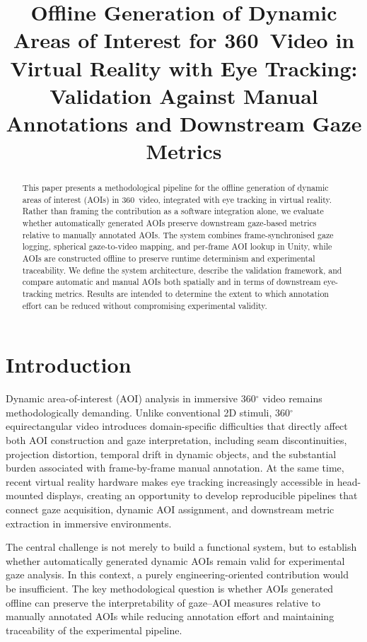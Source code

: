 \documentclass[11pt]{article}
\title{Offline Generation of Dynamic Areas of Interest for 360\textdegree\ Video in Virtual Reality with Eye Tracking: Validation Against Manual Annotations and Downstream Gaze Metrics}
\author{}
\date{}
\begin{document}
\maketitle

\begin{abstract}
This paper presents a methodological pipeline for the offline generation of dynamic areas of interest (AOIs) in 360\textdegree\ video, integrated with eye tracking in virtual reality. Rather than framing the contribution as a software integration alone, we evaluate whether automatically generated AOIs preserve downstream gaze-based metrics relative to manually annotated AOIs. The system combines frame-synchronised gaze logging, spherical gaze-to-video mapping, and per-frame AOI lookup in Unity, while AOIs are constructed offline to preserve runtime determinism and experimental traceability. We define the system architecture, describe the validation framework, and compare automatic and manual AOIs both spatially and in terms of downstream eye-tracking metrics. Results are intended to determine the extent to which annotation effort can be reduced without compromising experimental validity.
\end{abstract}


\section{Introduction}

Dynamic area-of-interest (AOI) analysis in immersive 360$^{\circ}$ video remains methodologically demanding. Unlike conventional 2D stimuli, 360$^{\circ}$ equirectangular video introduces domain-specific difficulties that directly affect both AOI construction and gaze interpretation, including seam discontinuities, projection distortion, temporal drift in dynamic objects, and the substantial burden associated with frame-by-frame manual annotation. At the same time, recent virtual reality hardware makes eye tracking increasingly accessible in head-mounted displays, creating an opportunity to develop reproducible pipelines that connect gaze acquisition, dynamic AOI assignment, and downstream metric extraction in immersive environments.

The central challenge is not merely to build a functional system, but to establish whether automatically generated dynamic AOIs remain valid for experimental gaze analysis. In this context, a purely engineering-oriented contribution would be insufficient. The key methodological question is whether AOIs generated offline can preserve the interpretability of gaze--AOI measures relative to manually annotated AOIs while reducing annotation effort and maintaining traceability of the experimental pipeline.
\end{document}
